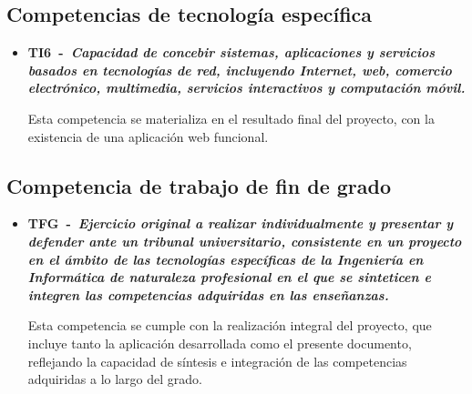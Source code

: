 \subsection{Competencias de tecnología específica}
\begin{itemize}    
    \item \textbf{TI6~-~\emph{Capacidad de concebir sistemas, aplicaciones y servicios basados en tecnologías de red, incluyendo Internet, web, comercio electrónico, multimedia, servicios interactivos y computación móvil.}}

    Esta competencia se materializa en el resultado final del proyecto, con la existencia de una aplicación web funcional.
    
\end{itemize}

\subsection{Competencia de trabajo de fin de grado}
\begin{itemize}
    \item \textbf{TFG~-~\emph{Ejercicio original a realizar individualmente y presentar y defender ante un tribunal universitario, consistente en un proyecto en el ámbito de las tecnologías específicas de la Ingeniería en Informática de naturaleza profesional en el que se sinteticen e integren las competencias adquiridas en las enseñanzas.}}

    Esta competencia se cumple con la realización integral del proyecto, que incluye tanto la aplicación desarrollada como el presente documento, reflejando la capacidad de síntesis e integración de las competencias adquiridas a lo largo del grado.

\end{itemize}
